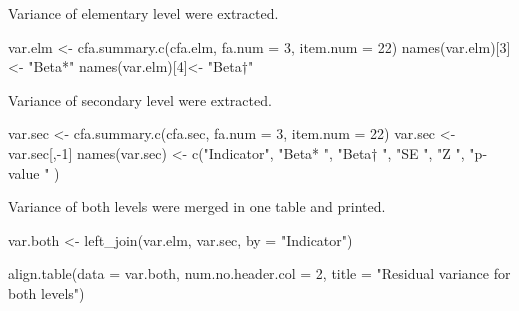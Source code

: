 \documentclass[
]{article}
\newenvironment{Shaded}{\begin{snugshade}}{\end{snugshade}}
\newcommand{\AttributeTok}[1]{\textcolor[rgb]{0.77,0.63,0.00}{#1}}
\newcommand{\DecValTok}[1]{\textcolor[rgb]{0.00,0.00,0.81}{#1}}
\newcommand{\FunctionTok}[1]{\textcolor[rgb]{0.00,0.00,0.00}{#1}}
\newcommand{\NormalTok}[1]{#1}
\newcommand{\OtherTok}[1]{\textcolor[rgb]{0.56,0.35,0.01}{#1}}
\newcommand{\SpecialCharTok}[1]{\textcolor[rgb]{0.00,0.00,0.00}{#1}}
\newcommand{\StringTok}[1]{\textcolor[rgb]{0.31,0.60,0.02}{#1}}
\begin{document}
Variance of elementary level were extracted.

\begin{Shaded}
\begin{Highlighting}[]
\NormalTok{var.elm }\OtherTok{\textless{}{-}} \FunctionTok{cfa.summary.c}\NormalTok{(cfa.elm, }\AttributeTok{fa.num =} \DecValTok{3}\NormalTok{, }\AttributeTok{item.num =} \DecValTok{22}\NormalTok{)}
\FunctionTok{names}\NormalTok{(var.elm)[}\DecValTok{3}\NormalTok{] }\OtherTok{\textless{}{-}} \StringTok{"Beta*"}
\FunctionTok{names}\NormalTok{(var.elm)[}\DecValTok{4}\NormalTok{]}\OtherTok{\textless{}{-}} \StringTok{"Beta†"}
\end{Highlighting}
\end{Shaded}

Variance of secondary level were extracted.

\begin{Shaded}
\begin{Highlighting}[]
\NormalTok{var.sec }\OtherTok{\textless{}{-}} \FunctionTok{cfa.summary.c}\NormalTok{(cfa.sec, }\AttributeTok{fa.num =} \DecValTok{3}\NormalTok{, }\AttributeTok{item.num =} \DecValTok{22}\NormalTok{)}
\NormalTok{var.sec }\OtherTok{\textless{}{-}}\NormalTok{ var.sec[,}\SpecialCharTok{{-}}\DecValTok{1}\NormalTok{]}
\FunctionTok{names}\NormalTok{(var.sec) }\OtherTok{\textless{}{-}} 
  \FunctionTok{c}\NormalTok{(}\StringTok{"Indicator"}\NormalTok{, }
    \StringTok{"Beta* "}\NormalTok{, }
    \StringTok{"Beta† "}\NormalTok{,}
    \StringTok{"SE "}\NormalTok{, }
    \StringTok{"Z "}\NormalTok{, }
    \StringTok{"p{-}value "}
\NormalTok{    )}
\end{Highlighting}
\end{Shaded}

Variance of both levels were merged in one table and printed.

\begin{Shaded}
\begin{Highlighting}[]
\NormalTok{var.both }\OtherTok{\textless{}{-}} \FunctionTok{left\_join}\NormalTok{(var.elm, }
\NormalTok{                     var.sec, }
                     \AttributeTok{by =} \StringTok{"Indicator"}\NormalTok{)}

\FunctionTok{align.table}\NormalTok{(}\AttributeTok{data =}\NormalTok{ var.both, }
            \AttributeTok{num.no.header.col =} \DecValTok{2}\NormalTok{, }
            \AttributeTok{title =} \StringTok{"Residual variance for both levels"}\NormalTok{)}
\end{Highlighting}
\end{Shaded}
\end{document}
